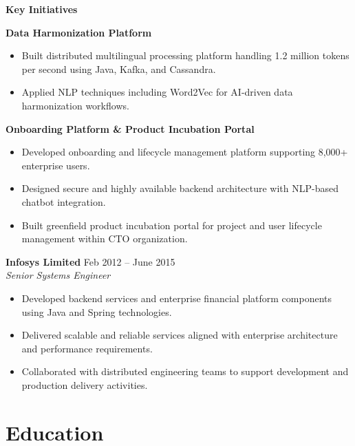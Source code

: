 \documentclass[11pt,a4paper]{article}
\begin{document}
\textbf{Key Initiatives}

\textbf{Data Harmonization Platform}
\begin{itemize}
    \item Built distributed multilingual processing platform handling 1.2 million tokens per second using Java, Kafka, and Cassandra.
    
    \item Applied NLP techniques including Word2Vec for AI-driven data harmonization workflows.
\end{itemize}

\textbf{Onboarding Platform \& Product Incubation Portal}
\begin{itemize}
    \item Developed onboarding and lifecycle management platform supporting 8,000+ enterprise users.
    
    \item Designed secure and highly available backend architecture with NLP-based chatbot integration.
    
    \item Built greenfield product incubation portal for project and user lifecycle management within CTO organization.
\end{itemize}

\vspace{4pt}

\textbf{Infosys Limited} \hfill Feb 2012 -- June 2015 \\
\textit{Senior Systems Engineer}

\begin{itemize}
    \item Developed backend services and enterprise financial platform components using Java and Spring technologies.
    
    \item Delivered scalable and reliable services aligned with enterprise architecture and performance requirements.
    
    \item Collaborated with distributed engineering teams to support development and production delivery activities.
\end{itemize}

\section*{Education}
\end{document}
